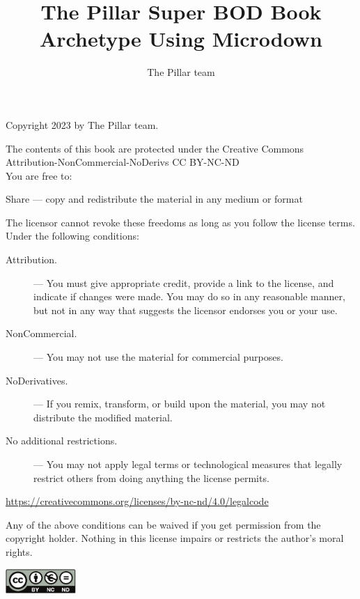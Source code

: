 \documentclass[10pt,twoside,english]{_support/latex/sbabook/sbabook}
\title{The Pillar Super BOD Book Archetype Using Microdown}
\author{The Pillar team}
\begin{document}
\newpage
\thispagestyle{empty}
\mbox{}
\newpage
\thispagestyle{empty}
\mbox{}

\maketitle
\pagestyle{titlingpage}
\thispagestyle{titlingpage} %

\cleartoverso
{\small

  Copyright 2023 by The Pillar team.

  The contents of this book are protected under the Creative Commons
  Attribution-NonCommercial-NoDerivs 
  CC BY-NC-ND\\
You are free to:
\begin{description}
\item Share --- copy and redistribute the material in any medium or format
\end{description}

The licensor cannot revoke these freedoms as long as you follow the license terms.
  Under the following conditions:
  \begin{description}
  \item[Attribution.] ---  You must give appropriate credit, provide a link to the license, and indicate if changes were made. You may do so in any reasonable manner, but not in any way that suggests the licensor endorses you or your use.
\item[NonCommercial.] ---  You may not use the material for commercial purposes.
\item [NoDerivatives.] ---  If you remix, transform, or build upon the material, you may not distribute the modified material.
\item [No additional restrictions.] ---  You may not apply legal terms or technological measures that legally restrict others from doing anything the license permits.
  \end{description}

\url{https://creativecommons.org/licenses/by-nc-nd/4.0/legalcode}

Any of the above conditions can be waived if you get permission from
the copyright holder. Nothing in this license impairs or restricts the
author's moral rights.

\begin{center}
    \includegraphics[width=0.2\textwidth]{_support/latex/CreativeCommons-BYNOCND.pdf}
\end{center}

}
\end{document}
